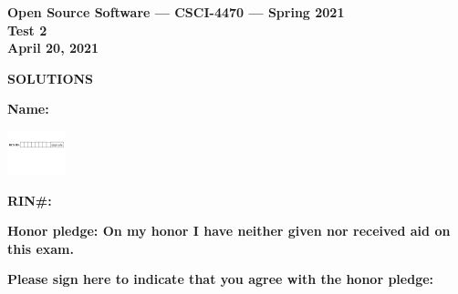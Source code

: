 \documentclass[10pt]{article}
\begin{document}
\thispagestyle{empty}

\vspace*{0.5in}

\begin{center}
\Large
\textbf{Open Source Software --- CSCI-4470 --- Spring 2021} \\
\textbf{Test 2} \\
\textbf{April 20, 2021}
\end{center}


\beginanswers
\begin{center}
\Large
\textbf{SOLUTIONS}
\end{center}

\else


\begin{center}

\textbf{\Large Name:} \underline {\hspace{2.0in}} \\

\bigskip
\bigskip

\centerline{
\includegraphics[height=0.5in]{boxes}
}


\bigskip

\textbf{\Large RIN\#:} \underline {\hspace{1.5in}}  

\vspace*{0.4in}
{\large\bf Honor pledge: On my honor I have neither given
nor received aid on this exam.}

\vspace*{0.1in}
{\large\bf Please sign here to indicate that you agree with the honor pledge: \underline {\hspace{1.5in}}}
\end{center}
\end{document}
